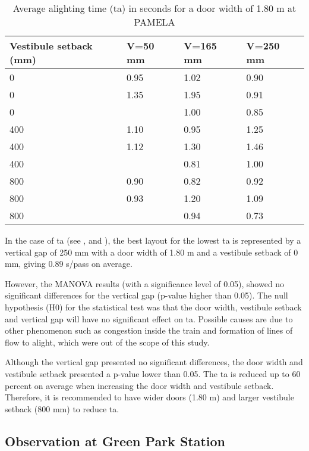 \begin{table}
  \centering
  \begin{tabular}{llll}
    \toprule
    Vestibule setback (mm) & V=50 mm & V=165 mm & V=250 mm \\
    \midrule
        0 & 0.95 & 1.02 & 0.90  \\
        0 & 1.35 & 1.95 & 0.91  \\
		0 &      & 1.00 & 0.85  \\
		400 & 1.10 & 0.95 & 1.25  \\
		400 & 1.12 & 1.30 & 1.46  \\
		400 &      & 0.81 & 1.00  \\
		800 & 0.90 & 0.82 & 0.92  \\
		800 & 0.93 & 1.20 & 1.09  \\
		800 &      & 0.94 & 0.73  \\
	\bottomrule
  \end{tabular}
  \caption{Average alighting time (ta) in seconds for a door width of 1.80 m at PAMELA}
  \label{tab:6} %
\end{table}

In the case of ta (see ,  and ), the best layout for the lowest ta is represented by a vertical gap of 250 mm with a door width of 1.80 m and a vestibule setback of 0 mm, giving 0.89 s/pass on average. 

However, the MANOVA results (with a significance level of 0.05), showed no significant differences for the vertical gap (p-value higher than 0.05). The null hypothesis (H0) for the statistical test was that the door width, vestibule setback and vertical gap will have no significant effect on ta. Possible causes are due to other phenomenon such as congestion inside the train and formation of lines of flow to alight, which were out of the scope of this study. 

Although the vertical gap presented no significant differences, the door width and vestibule setback presented a p-value lower than 0.05. The ta is reduced up to 60 percent on average when increasing the door width and vestibule setback. Therefore, it is recommended to have wider doors (1.80 m) and larger vestibule setback (800 mm) to reduce ta.

\subsection{Observation at Green Park Station}
\label{sec:4.2}

